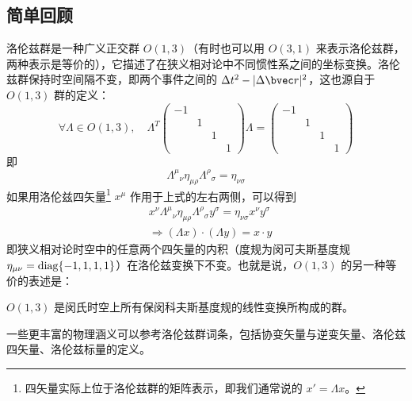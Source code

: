 

\subsection{简单回顾}
洛伦兹群是一种广义正交群 $O(1,3)$（有时也可以用 $O(3,1)$ 来表示洛伦兹群，两种表示是等价的），它描述了在狭义相对论中不同惯性系之间的坐标变换。洛伦兹群保持时空间隔不变，即两个事件之间的 $\Delta t^2-|\Delta \bvec r|^2$，这也源自于 $O(1,3)$ 群的定义：
\begin{equation}
\forall \Lambda \in O(1,3),\quad \Lambda^T \begin{pmatrix}
-1&&&\\
&1&&\\
&&1&\\
&&&1
\end{pmatrix}\Lambda =\begin{pmatrix}
-1&&&\\
&1&&\\
&&1&\\
&&&1
\end{pmatrix}
\end{equation}
即
\begin{equation}
\Lambda^\mu{}_{\nu} \eta_{\mu\rho}\Lambda^{\rho}{}_{\sigma}=\eta_{\nu\sigma}
\end{equation}
如果用洛伦兹四矢量\footnote{四矢量实际上位于洛伦兹群的矩阵表示，即我们通常说的 $x'=\Lambda x$。} $x^\mu$ 作用于上式的左右两侧，可以得到
\begin{equation}
\begin{aligned}
&x^\nu \Lambda^{\mu}{}_\nu \eta_{\mu\rho} \Lambda^\rho{}_\sigma y^\sigma=\eta_{\nu\sigma} x^\nu y^\sigma\\
&\Rightarrow (\Lambda x)\cdot (\Lambda y)=x\cdot y
\end{aligned}
\end{equation}
即狭义相对论时空中的任意两个四矢量的内积（度规为闵可夫斯基度规 $\eta_{\mu\nu}=\rm diag\{-1,1,1,1\}$）在洛伦兹变换下不变。也就是说，$O(1,3)$ 的另一种等价的表述是：
\begin{definition}{}
$O(1,3)$ 是闵氏时空上所有保闵科夫斯基度规的线性变换所构成的群。
\end{definition}
一些更丰富的物理涵义可以参考洛伦兹群词条，包括协变矢量与逆变矢量、洛伦兹四矢量、洛伦兹标量的定义。
